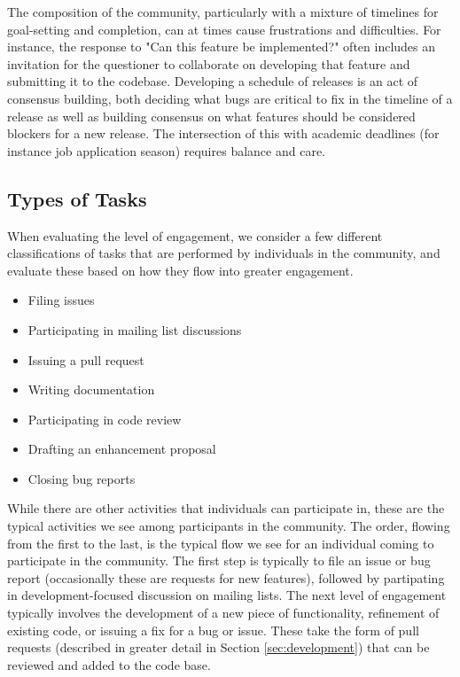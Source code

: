 The composition of the community, particularly with a mixture of timelines for
goal-setting and completion, can at times cause frustrations and difficulties.
For instance, the response to "Can this feature be implemented?" often includes
an invitation for the questioner to collaborate on developing that feature and
submitting it to the codebase.  Developing a schedule of releases is an act of
consensus building, both deciding what bugs are critical to fix in the timeline
of a release as well as building consensus on what features should be
considered blockers for a new release.  The intersection of this with academic
deadlines (for instance job application season) requires balance and care.

\subsection{Types of Tasks}

When evaluating the level of engagement, we consider a few different
classifications of tasks that are performed by individuals in the community,
and evaluate these based on how they flow into greater engagement.

\begin{itemize}
  \item Filing issues
  \item Participating in mailing list discussions
  \item Issuing a pull request
  \item Writing documentation
  \item Participating in code review
  \item Drafting an enhancement proposal
  \item Closing bug reports
\end{itemize}

While there are other activities that individuals can participate in, these are
the typical activities we see among participants in the community.  The order,
flowing from the first to the last, is the typical flow we see for an
individual coming to participate in the community.  The first step is typically
to file an issue or bug report (occasionally these are requests for new
features), followed by partipating in development-focused discussion on mailing
lists.  The next level of engagement typically involves the development of a
new piece of functionality, refinement of existing code, or issuing a fix for a
bug or issue.  These take the form of pull requests (described in greater
detail in Section \ref{sec:development}) that can be reviewed and added to the
code base.

